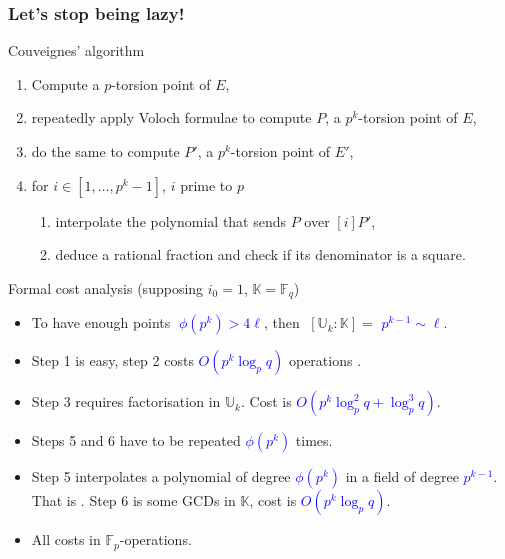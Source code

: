 \documentclass[10pt]{beamer}
\newcommand{\blue}[1]{\textcolor{blue}{#1}}  %
\newcommand{\K}{\mathbb{K}}  %
\newcommand{\U}{\mathbb{U}}  %
\newcommand{\F}{\mathbb{F}}  %
\newcommand{\euler}{\phi}  %
\newcommand{\0}{\mathcal{O}}  %
\begin{document}

\begin{frame}
  \frametitle{Let's stop being lazy!}

  \vspace{-2mm}

  \begin{block}{Couveignes' algorithm}
    \begin{enumerate}
    \item Compute a $p$-torsion point of $E$,
    \item repeatedly apply Voloch formulae to compute $P$, a $p^k$-torsion
      point of $E$,
    \item do the same to compute $P'$, a $p^k$-torsion point
      of $E'$,
    \item for $i \in [1,\dots,p^k-1]$, $i$ prime to $p$
      \begin{enumerate}
      \item interpolate the polynomial that sends $P$ over $[i]P'$,
      \item deduce a rational fraction and check if its denominator is
        a square.
      \end{enumerate}
    \end{enumerate}
  \end{block}

  \vspace{-2mm}

  \begin{block}{Formal cost analysis (supposing $i_0 = 1$, $\K=\F_q$)}
    \begin{itemize}
    \item To have enough points \blue{$\;\euler(p^k) > 4\ell$}, then
      $\;[\U_k:\K] =$ \blue{$p^{k-1} \sim \ell$}.
    \item Step 1 is easy, step 2 costs \blue{$O(p^k\log_pq)$}
      operations .
    \item Step 3 requires factorisation in $\U_k$. Cost is
      \blue{$O(p^{k}\log_p^2q + \log_p^3q)$}.
    \item Steps 5 and 6 have to be repeated
      \blue{$\euler(p^k)$} times.
    \item Step 5 interpolates a polynomial of degree
      \blue{$\euler(p^k)$} in a field of degree \blue{$p^{k-1}$}. That
      is
      \alt<2>{\alert{$O(p^{2k}\log_pq)$}}{\blue{$O(p^{2k}\log_pq)$}}. Step
      6 is some GCDs in $\K$, cost is \blue{$O(p^k\log_pq)$}.
    \item \alert<1>{All costs in $\F_p$-operations.}
    \end{itemize}
  \end{block}
\end{frame}
\end{document}
